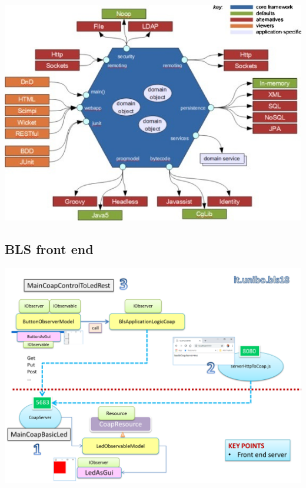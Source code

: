 \documentclass[10pt,a4paper,openright,twoside]{C:/Didattica/git/lab2014Bo/it.unibo.iss2015intro/docsInternal/contents/llncs}
\begin{document}
\medskip 
\includegraphics[scale = 0.5]{img/hex3.png}



\subsection{BLS front end }

\medskip 
\includegraphics[scale = 0.5]{img/bls18/bls18CoapFrontEnd.png}

 
\end{document}
